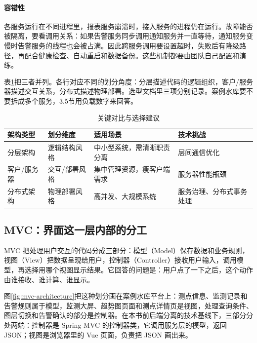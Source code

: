 \paragraph{容错性}各服务运行在不同进程里，报表服务崩溃时，接入服务的进程仍在运行。故障能否被隔离，要看调用关系：如果告警服务同步调用通知服务并一直等待，通知服务变慢时告警服务的线程也会被占满。因此跨服务调用要设置超时，失败后有降级路径，再配合健康检查、自动重启和数据备份。这些机制都要由团队自己配置和演练。

表\ref{tab:arch-comparison}把三者并列。各行对应不同的划分角度：分层描述代码的逻辑组织，客户\slash 服务器描述交互关系，分布式描述物理部署。选型文档里三项分别记录。案例水库要不要拆成多个服务，3.5节用负载数字来回答。

\begin{table}[htbp]
\centering
\caption{关键对比与选择建议}\label{tab:arch-comparison}
\begin{tabular}{p{2.8cm}p{2.8cm}p{4.2cm}p{4.2cm}}
\toprule
\textbf{架构类型} & \textbf{划分维度} & \textbf{适用场景} & \textbf{技术挑战} \\
\midrule
分层架构     & 逻辑结构风格 & 中小型系统，需清晰职责分离 & 层间通信优化 \\
客户/服务器   & 交互/部署风格 & 集中管理资源，瘦客户端需求  & 服务器性能瓶颈 \\
分布式架构   & 物理部署风格 & 高并发、大规模系统        & 服务治理、分布式事务处理 \\
\bottomrule
\end{tabular}
\end{table}

\subsection{MVC：界面这一层内部的分工}

MVC 把处理用户交互的代码分成三部分：模型（Model）保存数据和业务规则，视图（View）把数据呈现给用户，控制器（Controller）接收用户输入，调用模型，再选择用哪个视图显示结果。它回答的问题是：用户点了一下之后，这个动作由谁接收、谁计算、谁显示。

图\ref{fig:mvc-architecture}把这种划分画在案例水库平台上：测点信息、监测记录和告警规则属于模型，监测大屏、趋势图页面和测点详情页是视图，处理查询条件、图层切换和告警确认的部分是控制器。在本书前后端分离的技术基线下，三部分分处两端：控制器是 Spring MVC 的控制器类，它调用服务层的模型，返回 JSON；视图是浏览器里的 Vue 页面，负责把 JSON 画出来。

